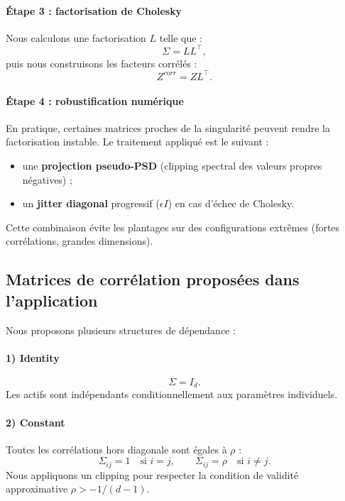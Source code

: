 ﻿\documentclass[11pt,a4paper]{article}
\begin{document}
\paragraph{Étape 3 : factorisation de Cholesky}
Nous calculons une factorisation $L$ telle que :
\begin{equation}
\Sigma = LL^\top,
\end{equation}
puis nous construisons les facteurs corrélés :
\begin{equation}
Z^{corr} = ZL^\top.
\end{equation}

\paragraph{Étape 4 : robustification numérique}
En pratique, certaines matrices proches de la singularité peuvent rendre la factorisation instable. Le traitement appliqué est le suivant :
\begin{itemize}
    \item une \textbf{projection pseudo-PSD} (clipping spectral des valeurs propres négatives) ;
    \item un \textbf{jitter diagonal} progressif ($\epsilon I$) en cas d'échec de Cholesky.
\end{itemize}
Cette combinaison évite les plantages sur des configurations extrêmes (fortes corrélations, grandes dimensions).

\subsection{Matrices de corrélation proposées dans l'application}

Nous proposons plusieurs structures de dépendance :

\paragraph{1) Identity}
\begin{equation}
\Sigma = I_d.
\end{equation}
Les actifs sont indépendants conditionnellement aux paramètres individuels.

\paragraph{2) Constant}
Toutes les corrélations hors diagonale sont égales à $\rho$ :
\begin{equation}
\Sigma_{ij}=1 \quad \mbox{si } i=j, \qquad
\Sigma_{ij}=\rho \quad \mbox{si } i\neq j.
\end{equation}
Nous appliquons un clipping pour respecter la condition de validité approximative $\rho > -1/(d-1)$.
\end{document}
